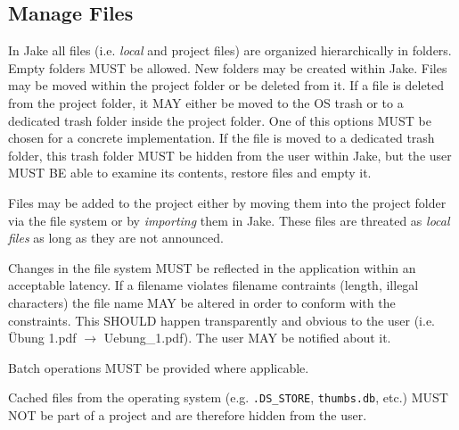\subsection{Manage Files}
In Jake all files (i.e. \emph{local} and {project files}) are organized hierarchically in folders. Empty folders MUST be allowed. New folders may be created within Jake. Files may be moved within the project folder or be deleted from it. If a file is deleted from the project folder, it MAY either be moved to the OS trash or to a dedicated trash folder inside the project folder. One of this options MUST be chosen for a concrete implementation. If the file is moved to a dedicated trash folder, this trash folder MUST be hidden from the user within Jake, but the user MUST BE able to examine its contents, restore files and empty it. 

Files may be added to the project either by moving them into the project folder via the file system or by \emph{importing} them in Jake. These files are threated as \emph{local files} as long as they are not announced. 

Changes in the file system MUST be reflected in the application within an acceptable latency. If a filename violates filename contraints (length, illegal characters) the file name MAY be altered in order to conform with the constraints. This SHOULD happen transparently and obvious to the user (i.e. Übung 1.pdf $\rightarrow$ Uebung\_1.pdf). The user MAY be notified about it.

Batch operations MUST be provided where applicable.

Cached files from the operating system (e.g. \texttt{.DS\_STORE}, \texttt{thumbs.db}, etc.) MUST NOT be part of a project and are therefore hidden from the user.


